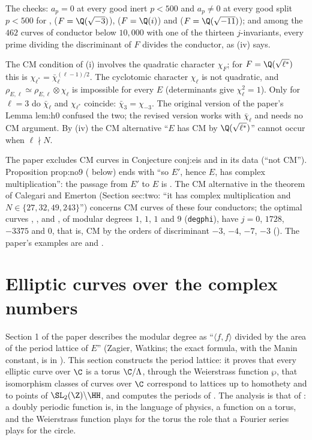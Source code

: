 The checks: $a_p=0$ at every good inert $p<500$ and $a_p\ne0$ at every good split $p<500$ for ,  ($F=\Q(\sqrt{-3})$),  ($F=\Q(i)$)
and  ($F=\Q(\sqrt{-11})$); and among the $462$ curves of conductor below $10{,}000$ with one of the thirteen $j$-invariants, every prime dividing the
discriminant of $F$ divides the conductor, as (iv) says.

\begin{warning}\label{warn:ellcurves:chi-l}
The CM condition of (i) involves the quadratic character $\chi_F$; for $F=\Q(\sqrt{\ell^*})$ this is $\chi_{\ell^*}=\bar\chi_\ell^{(\ell-1)/2}$. The cyclotomic
character $\chi_\ell$ is not quadratic, and $\rho_{E,\ell}\simeq\rho_{E,\ell}\otimes\chi_\ell$ is impossible for every $E$ (determinants give $\chi_\ell^2=1$). Only for $\ell=3$ do $\bar\chi_\ell$
and $\chi_{\ell^*}$ coincide: $\bar\chi_3=\chi_{-3}$. The original version of the paper's Lemma lem:h0 confused the two; the revised version works with $\bar\chi_\ell$ and needs no
CM argument. By (iv) the CM alternative ``$E$ has CM by $\Q(\sqrt{\ell^*})$'' cannot occur when $\ell\nmid N$.
\end{warning}

\begin{paperlink}\label{pl:ellcurves:cm}
The paper excludes CM curves in Conjecture conj:eis and in its data (``not CM''). Proposition prop:no9 ( below) ends with ``so $E'$, hence
$E$, has complex multiplication'': the passage from $E'$ to $E$ is . The CM alternative in the theorem of Calegari and Emerton (Section sec:two:
``it has complex multiplication and $N\in\{27,32,49,243\}$'') concerns CM curves of these four conductors; the optimal curves , ,
 and , of modular degrees $1$, $1$, $1$ and $9$ (\texttt{degphi}), have $j=0$, $1728$, $-3375$ and $0$, that is, CM by the orders of
discriminant $-3$, $-4$, $-7$, $-3$ (). The paper's examples are  and .
\end{paperlink}
\section{Elliptic curves over the complex numbers}\label{sec:ellcurves:complex}

Section 1 of the paper describes the modular degree as ``$\langle f,f\rangle$ divided by the area of the period lattice of $E$'' (Zagier, Watkins; the exact
formula, with the Manin constant, is in ). This section constructs the period lattice: it proves that every elliptic curve over $\C$ is a torus
$\C/\Lambda$, through the Weierstrass function $\wp$, that isomorphism classes of curves over $\C$ correspond to lattices up to homothety and to points of
$\SL_2(\Z)\backslash\HH$, and computes the periods of . The analysis is that of : a doubly periodic function is, in the language of
physics, a function on a torus, and the Weierstrass function plays for the torus the role that a Fourier series plays for the circle.

